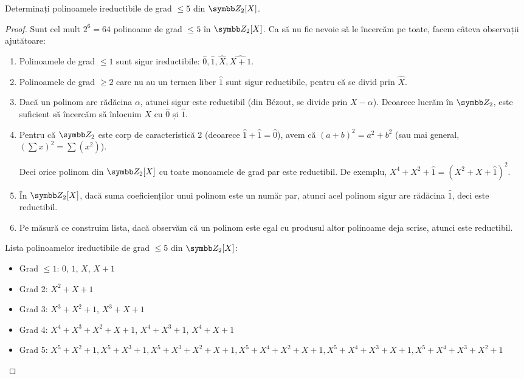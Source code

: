 \begin{exercise}[2.10]
Determinați polinoamele ireductibile de grad \(\leq 5\) din \(\integersmod{2}[X]\).
\end{exercise}
\begin{proof}
Sunt cel mult \(2^6 = 64\) polinoame de grad \(\leq 5\) în \(\integersmod{2}[X]\). Ca să nu fie nevoie să le încercăm pe toate, facem câteva observații ajutătoare:
\begin{enumerate}
    \item Polinoamele de grad \(\leq 1\) sunt sigur ireductibile: \(\widehat{0}, \widehat{1}, \widehat{X}, \widehat{X + 1}\).
    
    \item Polinoamele de grad \(\geq 2\) care nu au un termen liber \(\widehat{1}\) sunt sigur reductibile, pentru că se divid prin \(\widehat{X}\).
    
    \item Dacă un polinom are rădăcina \(\alpha\), atunci sigur este reductibil (din Bézout, se divide prin \(X - \alpha\)). Deoarece lucrăm în \(\integersmod{2}\), este suficient să încercăm să înlocuim \(X\) cu \(\widehat{0}\) și \(\widehat{1}\).
    
    \item Pentru că \(\integersmod{2}\) este corp de caracteristică 2 (deoarece \(\widehat{1} + \widehat{1} = \widehat{0}\)), avem că \((a + b)^2 = a^2 + b^2\) (sau mai general, \((\sum x)^2 = \sum (x^2)\)).
    
    Deci orice polinom din \(\integersmod{2}[X]\) cu toate monoamele de grad par este reductibil. De exemplu, \(X^4 + X^2 + \widehat{1} = (X^2 + X + \widehat{1})^2\).
    
    \item În \(\integersmod{2}[X]\), dacă suma coeficienților unui polinom este un număr par, atunci acel polinom sigur are rădăcina \(\widehat{1}\), deci este reductibil.
    
    \item Pe măsură ce construim lista, dacă observăm că un polinom este egal cu produsul altor polinoame deja scrise, atunci este reductibil.
\end{enumerate}

Lista polinoamelor ireductibile de grad \(\leq 5\) din \(\integersmod{2}[X]\):
\begin{itemize}
    \item Grad \(\leq 1\): \(0\), \(1\), \(X\), \(X + 1\)
    \item Grad 2: \(X^2 + X + 1\)
    \item Grad 3: \(X^3 + X^2 + 1\), \(X^3 + X + 1\)
    \item Grad 4: \(X^4 + X^3 + X^2 + X + 1\), \(X^4 + X^3 + 1\), \(X^4 + X + 1\)
    \item Grad 5: \(
        X^5 + X^2 + 1,
        X^5 + X^3 + 1,
        X^5 + X^3 + X^2 + X + 1,
        X^5 + X^4 + X^2 + X + 1,
        X^5 + X^4 + X^3 + X + 1,
        X^5 + X^4 + X^3 + X^2 + 1
    \)
\end{itemize}
\end{proof}

